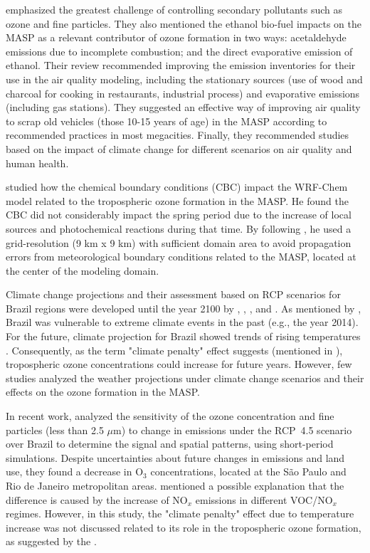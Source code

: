 \citet{Andrade2017} emphasized the greatest challenge of controlling secondary pollutants such as ozone and fine particles.
They also mentioned the ethanol bio-fuel impacts on the MASP as a relevant contributor of ozone formation in two ways: acetaldehyde emissions due to incomplete combustion; and the direct evaporative emission of ethanol.
Their review recommended improving the emission inventories for their use in the air quality modeling, including the stationary sources (use of wood and charcoal for cooking in restaurants, industrial process) and evaporative emissions (including gas stations). 
They suggested an effective way of improving air quality to scrap old vehicles (those 10-15 years of age) in the MASP according to recommended practices in most megacities.
Finally, they recommended studies based on the impact of climate change for different scenarios on air quality and human health.

\citet{Gavidia2018} studied how the chemical boundary conditions (CBC) impact the WRF-Chem model related to the tropospheric ozone formation in the MASP. 
He found the CBC did not considerably impact the spring period due to the increase of local sources and photochemical reactions during that time. 
By following \citet{Warner2011}, he used a grid-resolution (9 km x 9 km) with sufficient domain area to avoid propagation errors from meteorological boundary conditions related to the MASP, located at the center of the modeling domain.

Climate change projections and their assessment based on RCP scenarios for Brazil regions were developed until the year 2100 by \citet{Chou2014}, \citet{Cunningham2017}, \citet{Marengo2018}, and \citet{Nobre2019}.
As mentioned by \citet{Nobre2019}, Brazil was vulnerable to extreme climate events in the past (e.g., the year 2014).
For the future, climate projection for Brazil showed trends of rising temperatures \citep{Nobre2019}.
Consequently, as the term "climate penalty" effect suggests (mentioned in \citealt{IPCC2013}), tropospheric ozone concentrations could increase for future years. 
However, few studies \citep{Mazzoli2013,Schuch2020} analyzed the weather projections under climate change scenarios and their effects on the ozone formation in the MASP.

In recent work, \citet{Schuch2020} analyzed the sensitivity of the ozone concentration and fine particles (less than 2.5 $\mu$m) to change in emissions under the RCP~4.5 scenario over Brazil to determine the signal and spatial patterns, using short-period simulations.
Despite uncertainties about future changes in emissions and land use, they found a decrease in O$_3$ concentrations, located at the São Paulo and Rio de Janeiro metropolitan areas.
\citet{Schuch2020} mentioned a possible explanation that the difference is caused by the increase of NO$_x$ emissions in different VOC/NO$_x$ regimes. %
However, in this study, the "climate penalty" effect due to temperature increase was not discussed related to its role in the tropospheric ozone formation, as suggested by the \citet{IPCC2013}.

